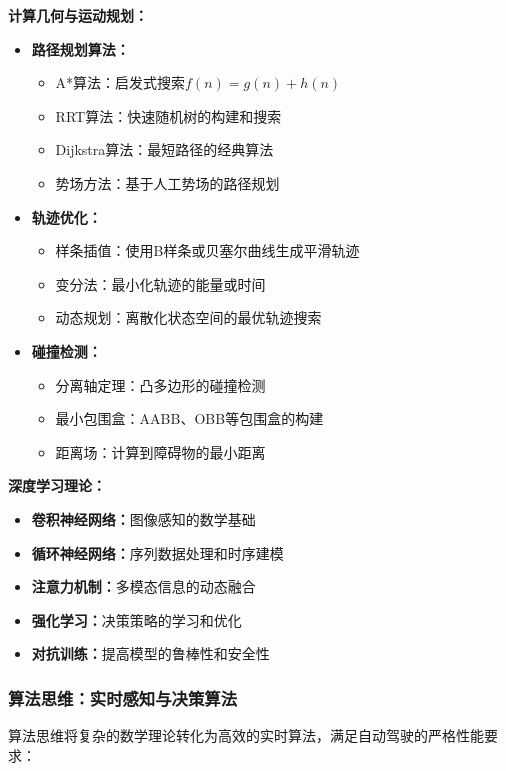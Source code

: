 \textbf{计算几何与运动规划：}
\begin{itemize}
\item \textbf{路径规划算法：}
\begin{itemize}
\item A*算法：启发式搜索$f(n) = g(n) + h(n)$
\item RRT算法：快速随机树的构建和搜索
\item Dijkstra算法：最短路径的经典算法
\item 势场方法：基于人工势场的路径规划
\end{itemize}
\item \textbf{轨迹优化：}
\begin{itemize}
\item 样条插值：使用B样条或贝塞尔曲线生成平滑轨迹
\item 变分法：最小化轨迹的能量或时间
\item 动态规划：离散化状态空间的最优轨迹搜索
\end{itemize}
\item \textbf{碰撞检测：}
\begin{itemize}
\item 分离轴定理：凸多边形的碰撞检测
\item 最小包围盒：AABB、OBB等包围盒的构建
\item 距离场：计算到障碍物的最小距离
\end{itemize}
\end{itemize}

\textbf{深度学习理论：}
\begin{itemize}
\item \textbf{卷积神经网络：}图像感知的数学基础
\item \textbf{循环神经网络：}序列数据处理和时序建模
\item \textbf{注意力机制：}多模态信息的动态融合
\item \textbf{强化学习：}决策策略的学习和优化
\item \textbf{对抗训练：}提高模型的鲁棒性和安全性
\end{itemize}

\subsubsection{算法思维：实时感知与决策算法}

算法思维将复杂的数学理论转化为高效的实时算法，满足自动驾驶的严格性能要求：

